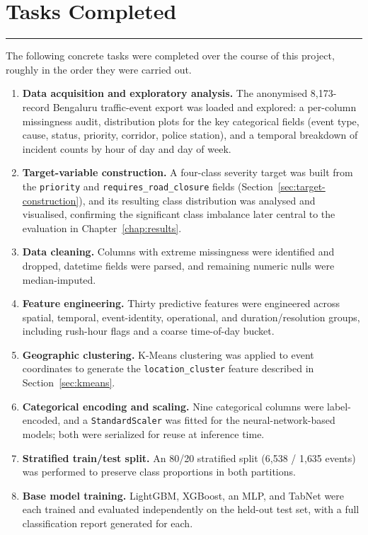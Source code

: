 \chapter{Tasks Completed}
\label{chap:tasks}
\noindent \rule{6.6in}{0.01in}
\newpage

The following concrete tasks were completed over the course of this project, roughly in the order they were carried out.

\begin{enumerate}
\item \textbf{Data acquisition and exploratory analysis.} The anonymised 8{,}173-record Bengaluru traffic-event export was loaded and explored: a per-column missingness audit, distribution plots for the key categorical fields (event type, cause, status, priority, corridor, police station), and a temporal breakdown of incident counts by hour of day and day of week.
\item \textbf{Target-variable construction.} A four-class severity target was built from the \texttt{priority} and \texttt{requires\_road\_closure} fields (Section~\ref{sec:target-construction}), and its resulting class distribution was analysed and visualised, confirming the significant class imbalance later central to the evaluation in Chapter~\ref{chap:results}.
\item \textbf{Data cleaning.} Columns with extreme missingness were identified and dropped, datetime fields were parsed, and remaining numeric nulls were median-imputed.
\item \textbf{Feature engineering.} Thirty predictive features were engineered across spatial, temporal, event-identity, operational, and duration/resolution groups, including rush-hour flags and a coarse time-of-day bucket.
\item \textbf{Geographic clustering.} K-Means clustering was applied to event coordinates to generate the \texttt{location\_cluster} feature described in Section~\ref{sec:kmeans}.
\item \textbf{Categorical encoding and scaling.} Nine categorical columns were label-encoded, and a \texttt{StandardScaler} was fitted for the neural-network-based models; both were serialized for reuse at inference time.
\item \textbf{Stratified train/test split.} An 80/20 stratified split (6{,}538 / 1{,}635 events) was performed to preserve class proportions in both partitions.
\item \textbf{Base model training.} LightGBM, XGBoost, an MLP, and TabNet were each trained and evaluated independently on the held-out test set, with a full classification report generated for each.

\end{enumerate}
